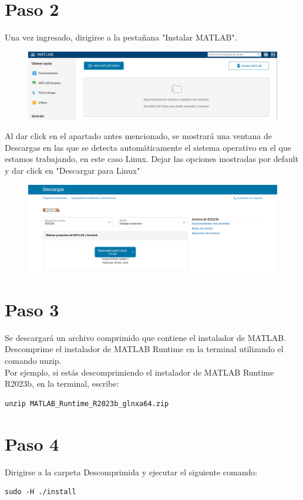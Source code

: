 \documentclass{article}
\begin{document}
\section*{Paso 2}
Una vez ingresado, dirigirse a la pestañana "Instalar MATLAB".\\
\begin{figure}[ht]
\centering
\includegraphics[width=1\textwidth]{tres.png}
\end{figure}
\newpage
Al dar click en el apartado antes mencionado, se mostrará una ventana de Descargas en las que se detecta automáticamente el sistema operativo en el que estamos trabajando, en este caso Linux. Dejar las opciones mostradas por default y dar click en "Descargar para Linux" 
\begin{figure}
\centering
\includegraphics[width=1\linewidth]{image.png}
\end{figure}
\section*{Paso 3}
Se descargará un archivo comprimido que contiene el instalador de MATLAB. Descomprime el instalador de MATLAB Runtime en la terminal utilizando el comando unzip.\\

Por ejemplo, si estás descomprimiendo el instalador de MATLAB Runtime R2023b, en la terminal, escribe:
\begin{verbatim}
unzip MATLAB_Runtime_R2023b_glnxa64.zip
\end{verbatim}
\section*{Paso 4}
Dirigirse a la carpeta Descomprimida y ejecutar el siguiente comando:
\begin{verbatim}
sudo -H ./install
\end{verbatim}
\end{document}
